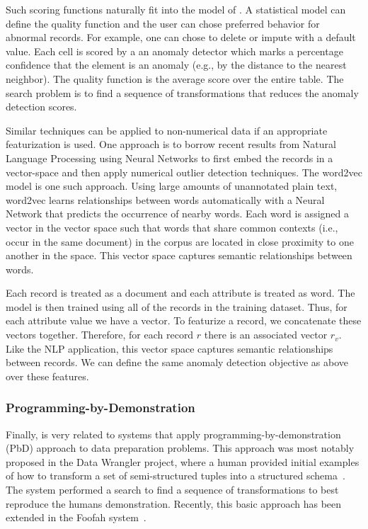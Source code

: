 Such scoring functions naturally fit into the model of \sys.
A statistical model can define the quality function and the user can chose preferred behavior for abnormal records.
For example, one can chose to delete or impute with a default value. Each cell is scored by a an anomaly detector which marks a percentage confidence that the element is an anomaly (e.g., by the distance to the nearest neighbor). The quality function is the average score over the entire table.
The search problem is to find a sequence of transformations that reduces the anomaly detection scores.

Similar techniques can be applied to non-numerical data if an appropriate featurization is used.
One approach is to borrow recent results from Natural Language Processing using Neural Networks to first embed the records in a vector-space and then apply numerical outlier detection techniques. The \textsf{word2vec} model \cite{mikolov2013distributed} is one such approach.
Using large amounts of unannotated plain text, \textsf{word2vec} learns relationships between words automatically with a Neural Network that predicts the occurrence of nearby words.
 Each word is assigned a vector in the vector space such that words that share common contexts (i.e., occur in the same document) in the corpus are located in close proximity to one another in the space.
 This vector space captures semantic relationships between words.
 
Each record is treated as a document and each attribute is treated as word.
 The model is then trained using all of the records in the training dataset.
 Thus, for each attribute value we have a vector.
 To featurize a record, we concatenate these vectors together.
 Therefore, for each record $r$ there is an associated vector $r_v$.
  Like the NLP application, this vector space captures semantic relationships between records.
  We can define the same anomaly detection objective as above over these features.
  
\subsubsection{Programming-by-Demonstration}
Finally, \sys is very related to systems that apply programming-by-demonstration (PbD) approach to data preparation problems.
This approach was most notably proposed in the Data Wrangler project, where a human provided initial examples of how to transform a set of semi-structured tuples into a structured schema~\cite{wrangler,trifacta}.
The system performed a search to find a sequence of transformations to best reproduce the humans demonstration.
Recently, this basic approach has been extended in the Foofah system~\cite{jin2017foofah}.

